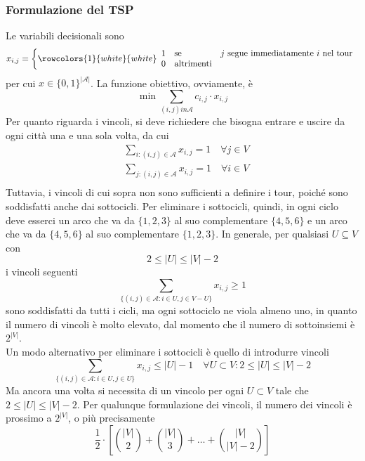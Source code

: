 \documentclass[a4paper]{extarticle}
\begin{document}
\subsubsection{Formulazione del TSP}
Le variabili decisionali sono
\[x_{i,j} = \left\{
    \rowcolors{1}{white}{white}
    \begin{array}{lll}
        1 & \text{se} & j \text{ segue immediatamente } i \text{ nel tour}\\
        0 & \text{altrimenti}
    \end{array}
\right.\]
per cui $x \in \{0,1\}^{\vert \mathcal{A} \vert}$. La funzione obiettivo, ovviamente, è
\[\min \sum_{(i,j) in \mathcal{A}} c_{i,j} \cdot x_{i,j}\]
Per quanto riguarda i vincoli, si deve richiedere che bisogna entrare e uscire da ogni città una e una sola volta, da cui
\begin{align*}
    &\sum_{i : (i,j) \in \mathcal{A}} x_{i,j} = 1 \hspace{1em} \forall j \in V\\
    &\sum_{j : (i,j) \in \mathcal{A}} x_{i,j} = 1 \hspace{1em} \forall i \in V\\
\end{align*}
Tuttavia, i vincoli di cui sopra non sono sufficienti a definire i tour, poiché sono soddisfatti anche dai sottocicli. Per eliminare i sottocicli, quindi, in ogni ciclo deve esserci un arco che va da $\{1,2,3\}$ al suo complementare $\{4,5,6\}$ e un arco che va da $\{4,5,6\}$ al suo complementare $\{1,2,3\}$. In generale, per qualsiasi $U \subseteq V$ con
\[2 \leq \vert U \vert \leq \vert V \vert - 2\]
i vincoli seguenti
\[\sum_{\{(i,j) \in \mathcal{A} : i \in U, j \in V-U\}} x_{i,j} \geq 1\]
sono soddisfatti da tutti i cicli, ma ogni sottociclo ne viola almeno uno, in quanto il numero di vincoli è molto elevato, dal momento che il numero di sottoinsiemi è $2^{\vert V \vert}$.\\
Un modo alternativo per eliminare i sottocicli è quello di introdurre vincoli
\[\sum_{\{(i,j) \in \mathcal{A} : i \in U, j \in U\}} x_{i,j} \leq \vert U \vert - 1 \hspace{1em} \forall U \subset V : 2 \leq \vert U \vert \leq \vert V \vert -2\]
Ma ancora una volta si necessita di un vincolo per ogni $U \subset V$ tale che $2 \leq \vert U \vert \leq \vert V \vert - 2$. Per qualunque formulazione dei vincoli, il numero dei vincoli è prossimo a $2^{\vert V \vert}$, o più precisamente
\[\dfrac{1}{2} \cdot \left[\binom{\vert V \vert}{2} + \binom{\vert V \vert}{3} + \dots + \binom{\vert V \vert}{\vert V \vert - 2} \right]\]
\end{document}
